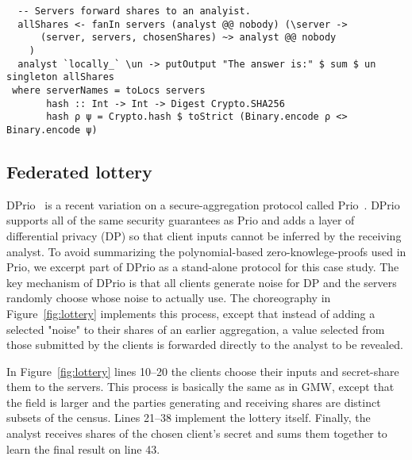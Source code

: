 \documentclass[sigplan,screen]{acmart}
\newcommand{\inlinecode}[2][haskell]{\texttt{#2}}
\begin{document}
\begin{figure*}
\begin{mdframed}
\begin{verbatim}
  -- Servers forward shares to an analyist.
  allShares <- fanIn servers (analyst @@ nobody) (\server ->
      (server, servers, chosenShares) ~> analyst @@ nobody
    )
  analyst `locally_` \un -> putOutput "The answer is:" $ sum $ un singleton allShares
 where serverNames = toLocs servers
       hash :: Int -> Int -> Digest Crypto.SHA256
       hash ρ ψ = Crypto.hash $ toStrict (Binary.encode ρ <> Binary.encode ψ)
\end{verbatim}
\caption{A federated-lottery protocol.
  One of the secret values chosen by the clients is revealed to the analyst;
  as long as at least one server acts honestly
  (randomly generates their \inlinecode{ρ} on line 22),
  the choice of which value to reveal will be random.
  Only the analyst learns any of the clients' secrets;
  they only learn the one secret, and they do not learn which one it was.
  The algorithm-step numbers and the unicode variable names align with
  the instructions in Section 6.2 of Keller~\textit{et~al}~\cite{dprio2023}.
  Client secrets are chosen at-will from a finite field (the type \inlinecode{Fp});
  we used the finite field of size 999983.}
\label{fig:lottery}
\end{mdframed}
\end{figure*}

\subsection{Federated lottery}
DPrio~\cite{dprio2023} is a recent variation on a secure-aggregation
protocol called Prio~\cite{corrigan2017prio}.
DPrio supports all of the same security guarantees as Prio and adds a layer of
differential privacy (DP)
so that client inputs cannot be inferred by the receiving analyst.
To avoid summarizing the polynomial-based zero-knowlege-proofs used in Prio,
we excerpt part of DPrio as a stand-alone protocol for this case study.
The key mechanism of DPrio is that all clients generate noise for DP and
the servers randomly choose whose noise to actually use.
The choreography in Figure~\ref{fig:lottery} implements this process,
except that instead of adding a selected "noise" to their shares of an earlier aggregation,
a value selected from those submitted by the clients is forwarded directly to the analyst
to be revealed.

In Figure~\ref{fig:lottery} lines 10--20 the clients choose their inputs and secret-share them to
the servers.
This process is basically the same as in GMW, except that the field is larger
and the parties generating and receiving shares are distinct subsets of the census.
Lines 21--38 implement the lottery itself.
Finally, the analyst receives shares of the chosen client's secret and sums them together to
learn the final result on line 43.
\end{document}
